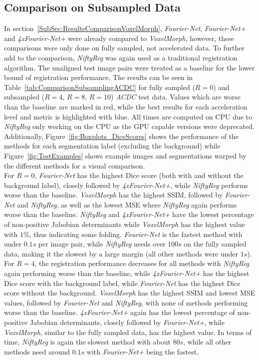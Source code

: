\subsection{Comparison on Subsampled Data} \label{SubSec:ResultsComparisonSubsampling}
In section~\ref{SubSec:ResultsComparisonVoxelMorph}, \emph{Fourier-Net}, \emph{Fourier-Net+} and \emph{4xFourier-Net+} were already compared to \emph{VoxelMorph}, however, these comparisons were only done on fully sampled, not accelerated data. To further add to the comparison, \emph{NiftyReg} was again used as a traditional registration algorithm. The unaligned test image pairs were treated as a baseline for the lower bound of registration performance. The results can be seen in Table~\ref{tab:ComparisonSubsamplingACDC} for fully sampled ($R=0$) and subsampled ($R=4$, $R=8$, $R=10$) \emph{ACDC} test data. Values which are worse than the baseline are marked in red, while the best results for each acceleration level and metric is highlighted with blue. All times are computed on CPU due to \emph{NiftyReg} only working on the CPU as the GPU capable versions were deprecated. Additionally, Figure~\ref{fig:Boxplots_DiceScores} shows the performance of the methods for each segmentation label (excluding the background) while Figure~\ref{fig:TestExamples} shows example images and segmentations warped by the different methods for a visual comparison.\\
For $R=0$, \emph{Fourier-Net} has the highest Dice score (both with and without the background label), closely followed by \emph{4xFourier-Net+}, while \emph{NiftyReg} performs worse than the baseline. \emph{VoxelMorph} has the highest SSIM, followed by \emph{Fourier-Net} and \emph{NiftyReg}, as well as the lowest MSE where \emph{NiftyReg} again performs worse than the baseline. \emph{NiftyReg} and \emph{4xFourier-Net+} have the lowest percentage of non-positive Jabobian determinants while \emph{VoxelMorph} has the highest value with $1\%$, thus indicating some folding. \emph{Fourier-Net} is the fastest method with under $0.1s$ per image pair, while \emph{NiftyReg} needs over $100s$ on the fully sampled data, making it the slowest by a large margin (all other methods were under $1s$).\\
For $R=4$, the registration performance decreases for all methods with \emph{NiftyReg} again performing worse than the baseline, while \emph{4xFourier-Net+} has the highest Dice score with the background label, while \emph{Fourier-Net} has the highest Dice score without the background. \emph{VoxelMorph} has the highest SSIM and lowest MSE values, followed by \emph{Fourier-Net} and \emph{NiftyReg}, with none of methods performing worse than the baseline. \emph{4xFourier-Net+} again has the lowest percentage of non-positive Jabobian determinants, closely followed by \emph{Fourier-Net+}, while \emph{VoxelMorph}, similar to the fully sampled data, has the highest value. In terms of time, \emph{NiftyReg} is again the slowest method with about $80s$, while all other methods need around $0.1s$ with \emph{Fourier-Net+} being the fastest.\\
